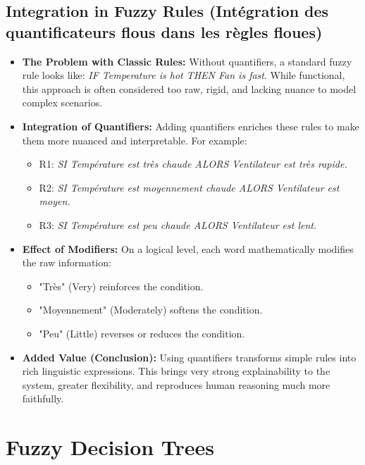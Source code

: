 \documentclass[11pt,a4paper]{article}
\begin{document}
\subsection{Integration in Fuzzy Rules (Intégration des quantificateurs flous dans les règles floues)}
\begin{itemize}
    \item \textbf{The Problem with Classic Rules:} Without quantifiers, a standard fuzzy rule looks like: \textit{IF Temperature is hot THEN Fan is fast}. While functional, this approach is often considered too raw, rigid, and lacking nuance to model complex scenarios.
    \item \textbf{Integration of Quantifiers:} Adding quantifiers enriches these rules to make them more nuanced and interpretable. For example:
    \begin{itemize}
        \item R1: \textit{SI Température est très chaude ALORS Ventilateur est très rapide.}
        \item R2: \textit{SI Température est moyennement chaude ALORS Ventilateur est moyen.}
        \item R3: \textit{SI Température est peu chaude ALORS Ventilateur est lent.}
    \end{itemize}
    \item \textbf{Effect of Modifiers:} On a logical level, each word mathematically modifies the raw information:
    \begin{itemize}
        \item "Très" (Very) reinforces the condition.
        \item "Moyennement" (Moderately) softens the condition.
        \item "Peu" (Little) reverses or reduces the condition.
    \end{itemize}
    \item \textbf{Added Value (Conclusion):} Using quantifiers transforms simple rules into rich linguistic expressions. This brings very strong explainability to the system, greater flexibility, and reproduces human reasoning much more faithfully.
\end{itemize}


\section{Fuzzy Decision Trees}
\end{document}
